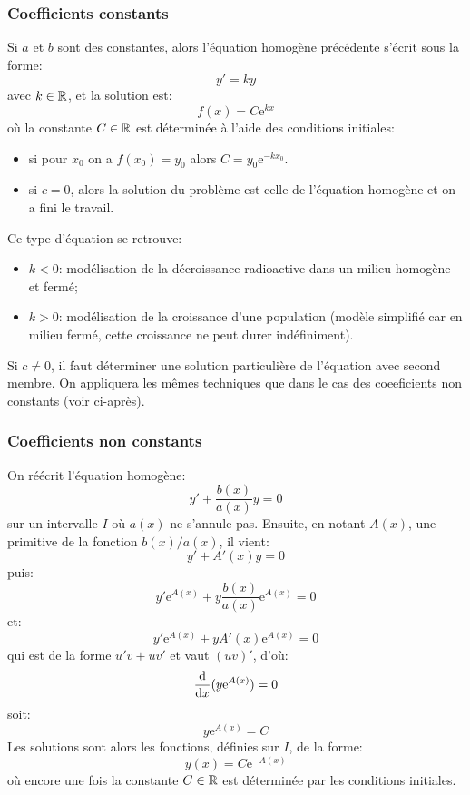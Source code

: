\subsubsection{Coefficients constants} 
Si $a$ et $b$ sont des constantes, alors l'équation homogène précédente s'écrit sous la forme:
\begin{equation}
y' = ky
\end{equation}
avec $k\in\mathbb R$, et la solution est:
\begin{equation}
f(x) = C\mathrm{e}^{kx}
\end{equation}
où la constante $C\in\mathbb R$ est déterminée à l'aide des conditions initiales:
\begin{itemize}
\item si pour $x_0$ on a $f(x_0) = y_0$ alors $C = y_0\mathrm{e}^{-kx_0}$. 
\item si $c=0$, alors la solution du problème est celle de l'équation homogène et on a fini le travail.
\end{itemize} 
Ce type d'équation se retrouve: 
\begin{itemize} 
\item $k<0$: modélisation de la décroissance radioactive dans un milieu homogène et fermé; 
\item $k>0$: modélisation de la croissance d'une population (modèle simplifié car en milieu fermé, cette croissance ne peut durer indéfiniment). 
\end{itemize} 
Si $c\ne0$, il faut déterminer une solution particulière de l'équation avec second membre. On appliquera les mêmes techniques que dans le cas des coeeficients non constants (voir ci-après). 
\subsubsection{Coefficients non constants} 
On réécrit l'équation homogène:
\begin{equation}
y' + \frac{b(x)}{a(x)} y = 0
\end{equation}
sur un intervalle $I$ où $a(x)$ ne s'annule pas. Ensuite, en notant $A(x)$, une primitive de la fonction $b(x)/a(x)$, il vient:
\begin{equation}
y' + A'(x)  y =0
\end{equation}
puis:
\begin{equation}
y'  \mathrm{e}^{A(x)} + y  \frac{b(x)}{a(x)}  \mathrm{e}^{A(x)} =0
\end{equation}
et:
\begin{equation}
y'  \mathrm{e}^{A(x)} + y  A'(x)  \mathrm{e}^{A(x)}=0
\end{equation}
qui est de la forme $u'  v + u  v'$ et vaut $ (u  v)'$, d'où:
\begin{equation}
\frac{\mathrm d}{\text{d} x }(y  \mathrm{e}^{A(x)})=0
\end{equation}
soit:
\begin{equation}
y  \mathrm{e}^{A(x)} = C
\end{equation}
Les solutions sont alors les fonctions, définies sur $I$, de la forme:
\begin{equation}\label{eq:ed:forme}
y(x) = C  \mathrm{e}^{-A(x)}
\end{equation}
où encore une fois la constante $C\in\mathbb R$ est déterminée par les conditions initiales. 
